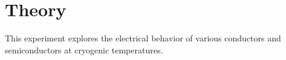 \chapter{Theory}
This experiment explores the electrical behavior of various conductors and semiconductors at cryogenic temperatures.
